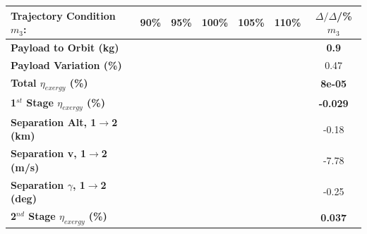 \begin{table}[ht]
	\centering
	
	\begin{tabular}{l c c c c c c} 
		\hline \textbf{Trajectory Condition}   \qquad  $m_{3}$:
		&90\%
		&95\%
		&100\%
		&105\%
		&110\%
		& $\Delta/\Delta$/\%$m_{3}$
		\\
		\hline \textbf{Payload to Orbit (kg)}
		& \textbf{\PayloadToOrbitmThreeNinetyNoReturn}
		& \textbf{\PayloadToOrbitmThreeNinetyFiveNoReturn}
		& \textbf{\PayloadToOrbitmThreeStandardNoReturn}
		& \textbf{\PayloadToOrbitmThreeOneHundredFiveNoReturn}
		& \textbf{\PayloadToOrbitmThreeOneHundredTenNoReturn}
		&\textbf{0.9}
		\\
		\textbf{Payload Variation (\%)}
		& \PayloadVarmThreeNinetyNoReturn
		& \PayloadVarmThreeNinetyFiveNoReturn
		& \PayloadVarmThreeStandardNoReturn
		& \PayloadVarmThreeOneHundredFiveNoReturn
		& \PayloadVarmThreeOneHundredTenNoReturn
		&0.47
		\\
		\textbf{Total $\eta_{exergy}$ (\%)}
		& \textbf{\totalExergyEffmThreeNinetyNoReturn}
		& \textbf{\totalExergyEffmThreeNinetyFiveNoReturn}
		& \textbf{\totalExergyEffmThreeStandardNoReturn}
		& \textbf{\totalExergyEffmThreeOneHundredFiveNoReturn}
		& \textbf{\totalExergyEffmThreeOneHundredTenNoReturn}
		& \textbf{8e-05}
		\\
		\hline 
		\textbf{1$^{st}$ Stage $\eta_{exergy}$ (\%)}
		& \textbf{\firstExergyEffmThreeNinetyNoReturn}
		& \textbf{\firstExergyEffmThreeNinetyFiveNoReturn}
		& \textbf{\firstExergyEffmThreeStandardNoReturn}
		& \textbf{\firstExergyEffmThreeOneHundredFiveNoReturn}
		& \textbf{\firstExergyEffmThreeOneHundredTenNoReturn}
		& \textbf{-0.029}
		\\
	
		\textbf{Separation Alt, 1$\rightarrow$2 (km)}
		& \firstsecondSeparationAltmThreeNinetyNoReturn
		& \firstsecondSeparationAltmThreeNinetyFiveNoReturn
		& \firstsecondSeparationAltmThreeStandardNoReturn
		& \firstsecondSeparationAltmThreeOneHundredFiveNoReturn
		& \firstsecondSeparationAltmThreeOneHundredTenNoReturn
		&-0.18
		\\
		\textbf{Separation v, 1$\rightarrow$2 (m/s)}
		& \firstsecondSeparationvmThreeNinetyNoReturn
		& \firstsecondSeparationvmThreeNinetyFiveNoReturn
		& \firstsecondSeparationvmThreeStandardNoReturn
		& \firstsecondSeparationvmThreeOneHundredFiveNoReturn
		& \firstsecondSeparationvmThreeOneHundredTenNoReturn
		&-7.78
		\\
		\textbf{Separation $\gamma$, 1$\rightarrow$2 (deg)}
		& \firstsecondSeparationgammamThreeNinetyNoReturn
		& \firstsecondSeparationgammamThreeNinetyFiveNoReturn
		& \firstsecondSeparationgammamThreeStandardNoReturn
		& \firstsecondSeparationgammamThreeOneHundredFiveNoReturn
		& \firstsecondSeparationgammamThreeOneHundredTenNoReturn
		&-0.25
		\\
		\hline 
		\textbf{2$^{nd}$ Stage $\eta_{exergy}$ (\%)}
		& \textbf{\secondExergyEffmThreeNinetyNoReturn}
		& \textbf{\secondExergyEffmThreeNinetyFiveNoReturn}
		& \textbf{\secondExergyEffmThreeStandardNoReturn}
		& \textbf{\secondExergyEffmThreeOneHundredFiveNoReturn}
		& \textbf{\secondExergyEffmThreeOneHundredTenNoReturn}
		& \textbf{0.037}
		\\
	

\end{tabular}
\end{table}

